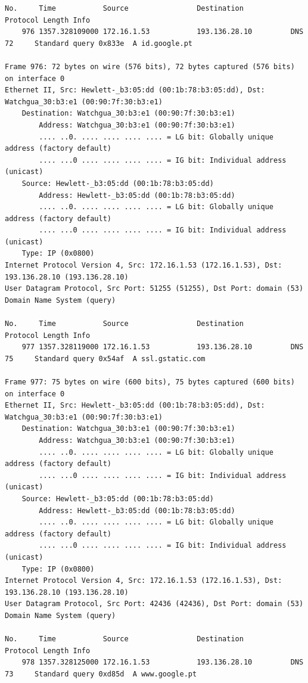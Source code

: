 \documentclass[a4paper,11pt]{article}
\begin{document}
\begin{lstlisting}
No.     Time           Source                Destination           Protocol Length Info
    976 1357.328109000 172.16.1.53           193.136.28.10         DNS      72     Standard query 0x833e  A id.google.pt

Frame 976: 72 bytes on wire (576 bits), 72 bytes captured (576 bits) on interface 0
Ethernet II, Src: Hewlett-_b3:05:dd (00:1b:78:b3:05:dd), Dst: Watchgua_30:b3:e1 (00:90:7f:30:b3:e1)
    Destination: Watchgua_30:b3:e1 (00:90:7f:30:b3:e1)
        Address: Watchgua_30:b3:e1 (00:90:7f:30:b3:e1)
        .... ..0. .... .... .... .... = LG bit: Globally unique address (factory default)
        .... ...0 .... .... .... .... = IG bit: Individual address (unicast)
    Source: Hewlett-_b3:05:dd (00:1b:78:b3:05:dd)
        Address: Hewlett-_b3:05:dd (00:1b:78:b3:05:dd)
        .... ..0. .... .... .... .... = LG bit: Globally unique address (factory default)
        .... ...0 .... .... .... .... = IG bit: Individual address (unicast)
    Type: IP (0x0800)
Internet Protocol Version 4, Src: 172.16.1.53 (172.16.1.53), Dst: 193.136.28.10 (193.136.28.10)
User Datagram Protocol, Src Port: 51255 (51255), Dst Port: domain (53)
Domain Name System (query)

No.     Time           Source                Destination           Protocol Length Info
    977 1357.328119000 172.16.1.53           193.136.28.10         DNS      75     Standard query 0x54af  A ssl.gstatic.com

Frame 977: 75 bytes on wire (600 bits), 75 bytes captured (600 bits) on interface 0
Ethernet II, Src: Hewlett-_b3:05:dd (00:1b:78:b3:05:dd), Dst: Watchgua_30:b3:e1 (00:90:7f:30:b3:e1)
    Destination: Watchgua_30:b3:e1 (00:90:7f:30:b3:e1)
        Address: Watchgua_30:b3:e1 (00:90:7f:30:b3:e1)
        .... ..0. .... .... .... .... = LG bit: Globally unique address (factory default)
        .... ...0 .... .... .... .... = IG bit: Individual address (unicast)
    Source: Hewlett-_b3:05:dd (00:1b:78:b3:05:dd)
        Address: Hewlett-_b3:05:dd (00:1b:78:b3:05:dd)
        .... ..0. .... .... .... .... = LG bit: Globally unique address (factory default)
        .... ...0 .... .... .... .... = IG bit: Individual address (unicast)
    Type: IP (0x0800)
Internet Protocol Version 4, Src: 172.16.1.53 (172.16.1.53), Dst: 193.136.28.10 (193.136.28.10)
User Datagram Protocol, Src Port: 42436 (42436), Dst Port: domain (53)
Domain Name System (query)

No.     Time           Source                Destination           Protocol Length Info
    978 1357.328125000 172.16.1.53           193.136.28.10         DNS      73     Standard query 0xd85d  A www.google.pt


\end{lstlisting}
\end{document}

